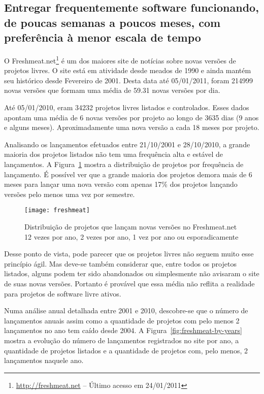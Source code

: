 \subsection[Entregas frequentes]{Entregar frequentemente software
  funcionando, de poucas semanas a poucos meses, com preferência à
  menor escala de tempo}

O Freshmeat.net\footnote{\url{http://freshmeat.net} -- Último acesso
  em 24/01/2011} é um dos maiores site de notícias sobre novas versões
de projetos livres. O site está em atividade desde meados de 1990 e
ainda mantém seu histórico desde Fevereiro de 2001. Desta data até
05/01/2011, foram 214999 novas versões que formam uma média de 59.31
novas versões por dia.

Até 05/01/2010, eram 34232 projetos livres listados e
controlados. Esses dados apontam uma média de 6 novas versões por
projeto ao longo de 3635 dias (9 anos e alguns meses).
Aproximadamente uma nova versão a cada 18 meses por projeto.

Analisando os lançamentos efetuados entre 21/10/2001 e 28/10/2010, a
grande maioria dos projetos listados não tem uma frequência alta e
estável de lançamentos. A Figura~\ref{fig:freshmeat} mostra a
distribuição de projetos por frequência de lançamento. É possível ver
que a grande maioria dos projetos demora mais de 6 meses para lançar
uma nova versão com apenas 17\% dos projetos lançando versões pelo
menos uma vez por semestre.


\begin{figure}[htb]
  \centering
  \texttt{[image: freshmeat]}
  \caption{Distribuição de projetos que lançam novas versões no
    Freshmeat.net 12 vezes por ano, 2 vezes por ano, 1 vez por ano ou
    esporadicamente}
  \label{fig:freshmeat}
\end{figure}

Desse ponto de vista, pode parecer que os projetos livres não seguem
muito esse princípio ágil. Mas deve-se também considerar que, entre
todos os projetos listados, alguns podem ter sido abandonados ou
simplesmente não avisaram o site de suas novas versões. Portanto é
provável que essa média não reflita a realidade para projetos de
software livre ativos.

Numa análise anual detalhada entre 2001 e 2010, descobre-se que o
número de lançamentos anuais assim como a quantidade de projetos com
pelo menos 2 lançamentos no ano tem caído desde 2004. A
Figura~\ref{fig:freshmeat-by-years} mostra a evolução do número de
lançamentos registrados no site por ano, a quantidade de projetos
listados e a quantidade de projetos com, pelo menos, 2 lançamentos
naquele ano.

